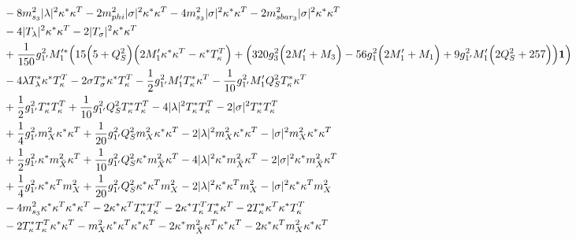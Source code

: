 {\begin{align}
 &-8 m_{s_3}^2 |\lambda|^2 {\kappa^*  \kappa^{T}} -2 m_{phi}^2 |\sigma|^2 {\kappa^*  \kappa^{T}} -4 m_{s_3}^2 |\sigma|^2 {\kappa^*  \kappa^{T}} -2 m_{sbar_3}^2 |\sigma|^2 {\kappa^*  \kappa^{T}} \nonumber \\ 
 &-4 |T_{\lambda}|^2 {\kappa^*  \kappa^{T}} -2 |T_{\sigma}|^2 {\kappa^*  \kappa^{T}} \nonumber \\ 
 &+\frac{1}{150} g_{1'}^{2} M_1'^* \Big(15 \Big(5 + Q_{S}^{2}\Big)\Big(2 M_1' {\kappa^*  \kappa^{T}}  - {\kappa^*  T_{\kappa}^{T}} \Big) + \Big(320 g_{3}^{2} \Big(2 M_1'  + M_3\Big) -56 g_{1}^{2} \Big(2 M_1'  + M_1\Big) + 9 g_{1'}^{2} M_1' \Big(2 Q_{S}^{2}  + 257\Big)\Big){\bf 1} \Big)\nonumber \\ 
 &-4 \lambda T_{\lambda}^* {\kappa^*  T_{\kappa}^{T}} -2 \sigma T_{\sigma}^* {\kappa^*  T_{\kappa}^{T}} -\frac{1}{2} g_{1'}^{2} M_1' {T_{\kappa}^*  \kappa^{T}} -\frac{1}{10} g_{1'}^{2} M_1' Q_{S}^{2} {T_{\kappa}^*  \kappa^{T}} \nonumber \\ 
 &+\frac{1}{2} g_{1'}^{2} {T_{\kappa}^*  T_{\kappa}^{T}} +\frac{1}{10} g_{1'}^{2} Q_{S}^{2} {T_{\kappa}^*  T_{\kappa}^{T}} -4 |\lambda|^2 {T_{\kappa}^*  T_{\kappa}^{T}} -2 |\sigma|^2 {T_{\kappa}^*  T_{\kappa}^{T}} \nonumber \\ 
 &+\frac{1}{4} g_{1'}^{2} {m_{X}^2  \kappa^*  \kappa^{T}} +\frac{1}{20} g_{1'}^{2} Q_{S}^{2} {m_{X}^2  \kappa^*  \kappa^{T}} -2 |\lambda|^2 {m_{X}^2  \kappa^*  \kappa^{T}} - |\sigma|^2 {m_{X}^2  \kappa^*  \kappa^{T}} \nonumber \\ 
 &+\frac{1}{2} g_{1'}^{2} {\kappa^*  m_{\bar{X}}^2  \kappa^{T}} +\frac{1}{10} g_{1'}^{2} Q_{S}^{2} {\kappa^*  m_{\bar{X}}^2  \kappa^{T}} -4 |\lambda|^2 {\kappa^*  m_{\bar{X}}^2  \kappa^{T}} -2 |\sigma|^2 {\kappa^*  m_{\bar{X}}^2  \kappa^{T}} \nonumber \\ 
 &+\frac{1}{4} g_{1'}^{2} {\kappa^*  \kappa^{T}  m_{X}^2} +\frac{1}{20} g_{1'}^{2} Q_{S}^{2} {\kappa^*  \kappa^{T}  m_{X}^2} -2 |\lambda|^2 {\kappa^*  \kappa^{T}  m_{X}^2} - |\sigma|^2 {\kappa^*  \kappa^{T}  m_{X}^2} \nonumber \\ 
 &-4 m_{s_3}^2 {\kappa^*  \kappa^{T}  \kappa^*  \kappa^{T}} -2 {\kappa^*  \kappa^{T}  T_{\kappa}^*  T_{\kappa}^{T}} -2 {\kappa^*  T_{\kappa}^{T}  T_{\kappa}^*  \kappa^{T}} -2 {T_{\kappa}^*  \kappa^{T}  \kappa^*  T_{\kappa}^{T}} \nonumber \\ 
 &-2 {T_{\kappa}^*  T_{\kappa}^{T}  \kappa^*  \kappa^{T}} - {m_{X}^2  \kappa^*  \kappa^{T}  \kappa^*  \kappa^{T}} -2 {\kappa^*  m_{\bar{X}}^2  \kappa^{T}  \kappa^*  \kappa^{T}} -2 {\kappa^*  \kappa^{T}  m_{X}^2  \kappa^*  \kappa^{T}} \nonumber \\ 

\end{align}}

